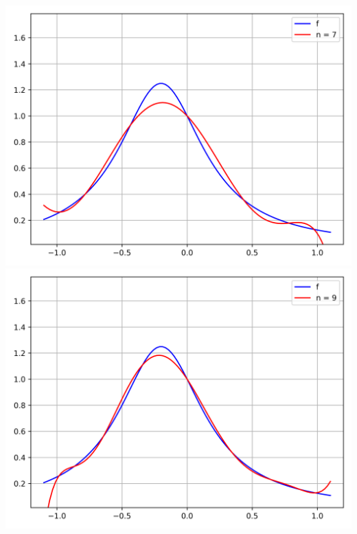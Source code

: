 \documentclass[11pt,class=report,crop=false]{standalone}
\begin{document}
\begin{exemple}
\begin{center}
  \includegraphics[scale=\myscale,scale=0.45]{figures/approx-tchebychev-03-7} \qquad
  \includegraphics[scale=\myscale,scale=0.45]{figures/approx-tchebychev-03-9}
\end{center}
\end{exemple}
\end{document}
